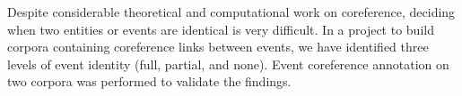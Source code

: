 Despite considerable theoretical and computational work on coreference, deciding when two entities or events are identical is very difficult. In a
 project to build corpora containing coreference links between events, we have
 identified three levels of event identity (full, partial, and none). Event
 coreference annotation on two corpora was performed to validate the findings.

